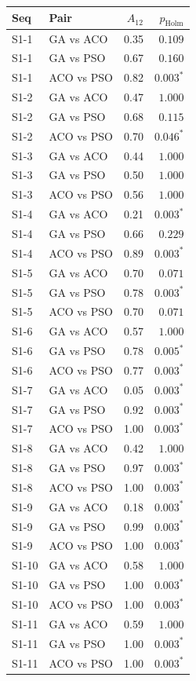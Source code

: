 \begin{tabular}{llrr}
\toprule
Seq & Pair & $A_{12}$ & $p_{\mathrm{Holm}}$ \\
\midrule
S1-1 & GA vs ACO & 0.35 & $0.109$ \\
S1-1 & GA vs PSO & 0.67 & $0.160$ \\
S1-1 & ACO vs PSO & 0.82 & $0.003^{*}$ \\
S1-2 & GA vs ACO & 0.47 & $1.000$ \\
S1-2 & GA vs PSO & 0.68 & $0.115$ \\
S1-2 & ACO vs PSO & 0.70 & $0.046^{*}$ \\
S1-3 & GA vs ACO & 0.44 & $1.000$ \\
S1-3 & GA vs PSO & 0.50 & $1.000$ \\
S1-3 & ACO vs PSO & 0.56 & $1.000$ \\
S1-4 & GA vs ACO & 0.21 & $0.003^{*}$ \\
S1-4 & GA vs PSO & 0.66 & $0.229$ \\
S1-4 & ACO vs PSO & 0.89 & $0.003^{*}$ \\
S1-5 & GA vs ACO & 0.70 & $0.071$ \\
S1-5 & GA vs PSO & 0.78 & $0.003^{*}$ \\
S1-5 & ACO vs PSO & 0.70 & $0.071$ \\
S1-6 & GA vs ACO & 0.57 & $1.000$ \\
S1-6 & GA vs PSO & 0.78 & $0.005^{*}$ \\
S1-6 & ACO vs PSO & 0.77 & $0.003^{*}$ \\
S1-7 & GA vs ACO & 0.05 & $0.003^{*}$ \\
S1-7 & GA vs PSO & 0.92 & $0.003^{*}$ \\
S1-7 & ACO vs PSO & 1.00 & $0.003^{*}$ \\
S1-8 & GA vs ACO & 0.42 & $1.000$ \\
S1-8 & GA vs PSO & 0.97 & $0.003^{*}$ \\
S1-8 & ACO vs PSO & 1.00 & $0.003^{*}$ \\
S1-9 & GA vs ACO & 0.18 & $0.003^{*}$ \\
S1-9 & GA vs PSO & 0.99 & $0.003^{*}$ \\
S1-9 & ACO vs PSO & 1.00 & $0.003^{*}$ \\
S1-10 & GA vs ACO & 0.58 & $1.000$ \\
S1-10 & GA vs PSO & 1.00 & $0.003^{*}$ \\
S1-10 & ACO vs PSO & 1.00 & $0.003^{*}$ \\
S1-11 & GA vs ACO & 0.59 & $1.000$ \\
S1-11 & GA vs PSO & 1.00 & $0.003^{*}$ \\
S1-11 & ACO vs PSO & 1.00 & $0.003^{*}$ \\
\bottomrule
\end{tabular}
